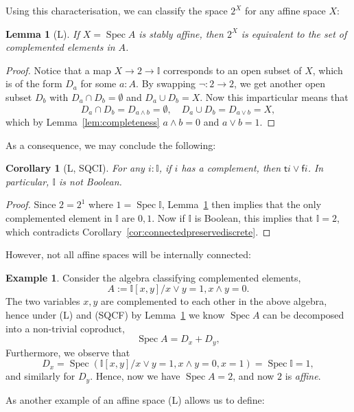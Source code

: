 \documentclass[12pt]{amsart}
\newtheorem{lemma}[theorem]{Lemma}
\newtheorem{corollary}[theorem]{Corollary}
\theoremstyle{definition}
\newtheorem{example}[theorem]{Example}
\newcommand{\mbb}[1]{\mathbb{#1}}
\newcommand{\I}{\mbb I}
\newcommand{\ms}[1]{\mathsf{#1}}
\newcommand{\emp}{\emptyset}
\newcommand{\spec}{\operatorname{Spec}}
\begin{document}
Using this characterisation, we can classify the space $2^X$ for any affine space $X$:

\begin{lemma}[L]\label{lem:decompcomplement}
  If $X = \spec A$ is stably affine, then $2^X$ is equivalent to the set of complemented elements in $A$.
\end{lemma}
\begin{proof}
  Notice that a map $X \to 2 \to \I$ corresponds to an open subset of $X$, which is of the form $D_a$ for some $a:A$. By swapping $\neg : 2 \to 2$, we get another open subset $D_b$ with $D_a \cap D_b = \emp$ and $D_a \cup D_b = X$. Now this imparticular means that
  \[ D_a \cap D_b = D_{a \wedge b} = \emp, \quad D_a \cup D_b = D_{a\vee b} = X, \]
  which by Lemma~\ref{lem:completeness} $a \wedge b = 0$ and $a \vee b = 1$. 
\end{proof}

As a consequence, we may conclude the following:

\begin{corollary}[L, SQCI]
  For any $i : \I$, if $i$ has a complement, then $\ms ti \vee \ms fi$. In particular, $\I$ is not Boolean.
\end{corollary}
\begin{proof}
  Since $2 = 2^1$ where $1 = \spec \I$, Lemma~\ref{lem:decompcomplement} then implies that the only complemented element in $\I$ are $0,1$. Now if $\I$ is Boolean, this implies that $\I = 2$, which contradicts Corollary~\ref{cor:connectedpreservediscrete}.
\end{proof}

However, not all affine spaces will be internally connected:

\begin{example}
  Consider the algebra classifying complemented elements,
  \[ A := \I[x,y]/x\vee y = 1,x \wedge y = 0. \]
  The two variables $x,y$ are complemented to each other in the above algebra, hence under (L) and (SQCF) by Lemma~\ref{lem:decompcomplement} we know $\spec A$ can be decomposed into a non-trivial coproduct,
  \[ \spec A = D_x + D_y, \]
  Furthermore, we observe that 
  \[ D_x = \spec(\I[x,y]/x \vee y = 1,x \wedge y = 0,x =1) = \spec \I = 1, \]
  and similarly for $D_y$. Hence, now we have $\spec A = 2$, and now $2$ is \emph{affine}.
\end{example}

As another example of an affine space (L) allows us to define:
\end{document}
